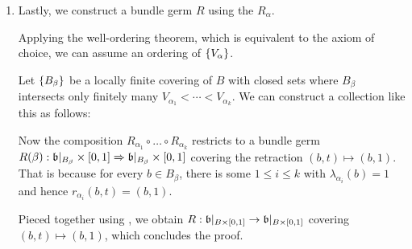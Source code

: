 \begin{scope}
\begin{myproof}
\begin{enumerate}
            \item Lastly, we construct a bundle germ $R$ using the $R_\alpha$.

            Applying the well-ordering theorem, which is equivalent to the axiom of choice, we can assume an ordering of $\{V_\alpha\}$.

            Let $\{B_\beta\}$ be a locally finite covering of $B$ with closed sets where $B_\beta$ intersects only finitely many $V_{\alpha_1} < \cdots < V_{\alpha_k}$.
            We can construct a collection like this as follows:

            Now the composition $R_{\alpha_1} \circ \ldots \circ R_{\alpha_k}$ restricts to a bundle germ $R(\beta): \mathfrak{b}\vert_{B_\beta} \times{} [0, 1] \Rightarrow{} \mathfrak{b}\vert_{B_\beta} \times{} [0, 1]$ covering the retraction $(b, t) \mapsto (b, 1)$.
            That is because for every $b \in B_\beta$, there is some $1 \le i \le k$ with $\lambda_{\alpha_i}(b) = 1$ and hence $r_{\alpha_i}(b, t) = (b, 1)$.
            
            Pieced together using , we obtain $R: \mathfrak{b}\vert_{B \times{} [0, 1]} \to \mathfrak{b}\vert_{B \times{} [0, 1]}$ covering $(b, t) \mapsto (b, 1)$, which concludes the proof.
        \end{enumerate}    
    \end{myproof}
\end{scope}